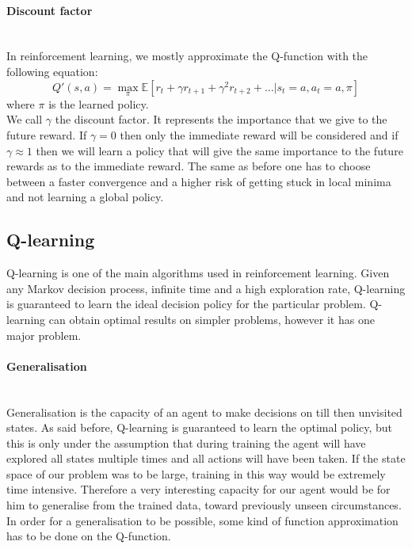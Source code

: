 \paragraph{Discount factor}\mbox{}\\
In reinforcement learning, we mostly approximate the Q-function with the following equation:
\begin{equation}
	Q'(s,a) = \max_{\pi} \mathbb{E}[r_t+\gamma r_{t+1}+\gamma^2 r_{t+2}+...| s_t=a, a_t = a,\pi]
\end{equation}
where $\pi$ is the learned policy.\\
We call $\gamma$ the discount factor. It represents the importance that we give to the future reward. If $\gamma = 0$ then only the immediate reward will be considered and if $\gamma \approx 1$ then we will learn a policy that will give the same importance to the future rewards as to the immediate reward. The same as before one has to choose between a faster convergence and a higher risk of getting stuck in local minima and not learning a global policy.
\subsection{Q-learning}
Q-learning\cite{watkins1992q} is one of the main algorithms used in reinforcement learning. Given any Markov decision process, infinite time and a high exploration rate, Q-learning is guaranteed to learn the ideal decision policy for the particular problem. Q-learning can obtain optimal results on simpler problems, however it has one major problem.
\paragraph{Generalisation}\mbox{}\\
Generalisation is the capacity of an agent to make decisions on till then unvisited states. As said before, Q-learning is guaranteed to learn the optimal policy, but this is only under the assumption that during training the agent will have explored all states multiple times and all actions will have been taken. If the state space of our problem was to be large, training in this way would be extremely time intensive. Therefore a very interesting capacity for our agent would be for him to generalise from the trained data, toward previously unseen circumstances. In order for a generalisation to be possible, some kind of function approximation has to be done on the Q-function.
